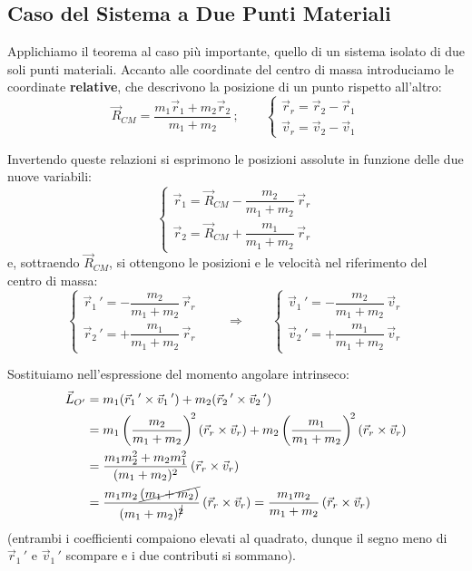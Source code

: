 \subsection{Caso del Sistema a Due Punti Materiali}

Applichiamo il teorema al caso più importante, quello di un sistema isolato di due soli punti materiali. Accanto alle coordinate del centro di massa introduciamo le coordinate \textbf{relative}, che descrivono la posizione di un punto rispetto all'altro:
\begin{equation}
    \vec{R}_{CM} = \frac{m_1 \vec{r}_1 + m_2 \vec{r}_2}{m_1 + m_2}
    \, ; \qquad
    \begin{cases}
        \vec{r}_r = \vec{r}_2 - \vec{r}_1 \\
        \vec{v}_r = \vec{v}_2 - \vec{v}_1
    \end{cases}
\end{equation}

Invertendo queste relazioni si esprimono le posizioni assolute in funzione delle due nuove variabili:
\begin{equation}
    \begin{cases}
        \vec{r}_1 = \vec{R}_{CM} - \dfrac{m_2}{m_1 + m_2}\,\vec{r}_r \\[8pt]
        \vec{r}_2 = \vec{R}_{CM} + \dfrac{m_1}{m_1 + m_2}\,\vec{r}_r
    \end{cases}
\end{equation}
e, sottraendo $\vec{R}_{CM}$, si ottengono le posizioni e le velocità nel riferimento del centro di massa:
\begin{equation}
    \begin{cases}
        \vec{r}_1\,' = - \dfrac{m_2}{m_1 + m_2}\,\vec{r}_r \\[8pt]
        \vec{r}_2\,' = + \dfrac{m_1}{m_1 + m_2}\,\vec{r}_r
    \end{cases}
    \qquad \Longrightarrow \qquad
    \begin{cases}
        \vec{v}_1\,' = - \dfrac{m_2}{m_1 + m_2}\,\vec{v}_r \\[8pt]
        \vec{v}_2\,' = + \dfrac{m_1}{m_1 + m_2}\,\vec{v}_r
    \end{cases}
\end{equation}

Sostituiamo nell'espressione del momento angolare intrinseco:
\begin{align}
    \vec{L}_{O'} &= m_1 (\vec{r}_1\,' \times \vec{v}_1\,') + m_2 (\vec{r}_2\,' \times \vec{v}_2\,') \\
    &= m_1 \left( \frac{m_2}{m_1+m_2} \right)^{\!2} (\vec{r}_r \times \vec{v}_r)
     + m_2 \left( \frac{m_1}{m_1+m_2} \right)^{\!2} (\vec{r}_r \times \vec{v}_r) \\
    &= \frac{m_1 m_2^2 + m_2 m_1^2}{(m_1+m_2)^2} \, (\vec{r}_r \times \vec{v}_r) \\
    &= \frac{m_1 m_2 \,\cancel{(m_1 + m_2)}}{(m_1+m_2)^{\cancel{2}}} \, (\vec{r}_r \times \vec{v}_r)
     = \frac{m_1 m_2}{m_1+m_2} \, (\vec{r}_r \times \vec{v}_r)
\end{align}
(entrambi i coefficienti compaiono elevati al quadrato, dunque il segno meno di $\vec{r}_1\,'$ e $\vec{v}_1\,'$ scompare e i due contributi si sommano).

